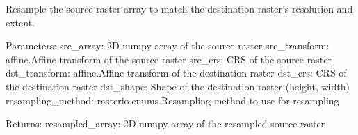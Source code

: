 \documentclass[letterpaper,10pt,english]{sphinxmanual}
\begin{document}
\begin{fulllineitems}
\label{\detokenize{akhdefo_functions:akhdefo_functions.Akhdefo_Tools.resample_raster}}
\pysigstartsignatures
{}
\pysigstopsignatures
\sphinxAtStartPar
Resample the source raster array to match the destination raster’s resolution and extent.

\sphinxAtStartPar
Parameters:
\sphinxhyphen{} src\_array: 2D numpy array of the source raster
\sphinxhyphen{} src\_transform: affine.Affine transform of the source raster
\sphinxhyphen{} src\_crs: CRS of the source raster
\sphinxhyphen{} dst\_transform: affine.Affine transform of the destination raster
\sphinxhyphen{} dst\_crs: CRS of the destination raster
\sphinxhyphen{} dst\_shape: Shape of the destination raster (height, width)
\sphinxhyphen{} resampling\_method: rasterio.enums.Resampling method to use for resampling

\sphinxAtStartPar
Returns:
\sphinxhyphen{} resampled\_array: 2D numpy array of the resampled source raster

\end{fulllineitems}

\end{document}
